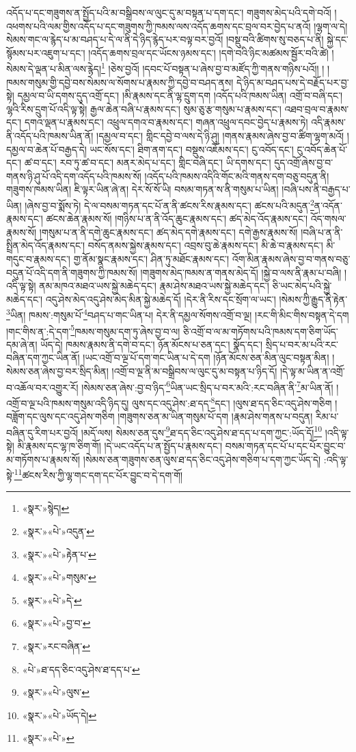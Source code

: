 འདོད་པ་དང་གཟུགས་ན་སྤྱོད་པའི་མ་བསྒྲིབས་ལ་ལུང་དུ་མ་བསྟན་པ་དག་དང་། གཟུགས་མེད་པའི་དགེ་བའོ། །འཕགས་པའི་ལམ་གྱིས་འདོད་པ་དང་གཟུགས་ཀྱི་ཁམས་ལས་འདོད་ཆགས་དང་བྲལ་བར་བྱེད་པ་ནའོ། །ལྷག་ལ་དེ། སེམས་གང་ལ་རྙེད་པ་མ་བཤད་པ་དེ་ལ་ནི་དེ་ཉིད་རྙེད་པར་བལྟ་བར་བྱའོ། །བསྡུ་བའི་ཚིགས་སུ་བཅད་པ་ནི། སྐྱེ་དང་སྙོམས་པར་འཇུག་པ་དང་། །འདོད་ཆགས་བྲལ་དང་ཡོངས་ཉམས་དང་། །དགེ་བའི་ཉིང་མཚམས་སྦྱོར་བའི་ཚེ། །སེམས་དེ་ལྡན་པ་མིན་ལས་རྙེད།\footnote{«སྣར་»སྙེད།} །ཅེས་བྱའོ། །དབང་པོ་བསྟན་པ་ཞེས་བྱ་བ་མཛོད་ཀྱི་གནས་གཉིས་པའོ།། །
།ཁམས་གསུམ་གྱི་དབྱེ་བས་སེམས་ལ་སོགས་པ་རྣམས་ཀྱི་དབྱེ་བ་བཤད་ནས། དེ་ཉིད་མ་བཤད་པས་དེ་བརྗོད་པར་བྱ་སྟེ། དམྱལ་བ་ཡི་དགས་དུད་འགྲོ་དང་། །མི་རྣམས་དང་ནི་ལྷ་དྲུག་དག །འདོད་པའི་ཁམས་ཡིན། འགྲོ་བ་བཞི་དང་། ལྷའི་རིས་དྲུག་པོ་འདི་ལྟ་སྟེ། རྒྱལ་ཆེན་བཞི་པ་རྣམས་དང་། སུམ་ཅུ་རྩ་གསུམ་པ་རྣམས་དང་། འཐབ་བྲལ་བ་རྣམས་དང་། དགའ་ལྡན་པ་རྣམས་དང་། འཕྲུལ་དགའ་བ་རྣམས་དང་། གཞན་འཕྲུལ་དབང་བྱེད་པ་རྣམས་ཏེ། འདི་རྣམས་ནི་འདོད་པའི་ཁམས་ཡིན་ནོ། །དམྱལ་བ་དང་། གླིང་དབྱེ་བ་ལས་དེ་ཉི་ཤུ། །གནས་རྣམས་ཞེས་བྱ་བ་ཚིག་ལྷག་མའོ། །དམྱལ་བ་ཆེན་པོ་བརྒྱད་དེ། ཡང་སོས་དང་། ཐིག་ནག་དང་། བསྡུས་འཇོམས་དང་། ངུ་འབོད་དང་། ངུ་འབོད་ཆེན་པོ་དང་། ཚ་བ་དང་། རབ་ཏུ་ཚ་བ་དང་། མནར་མེད་པ་དང་། གླིང་བཞི་དང་། ཡི་དགས་དང་། དུད་འགྲོ་ཞེས་བྱ་བ་གནས་ཉི་ཤུ་པོ་འདི་དག་འདོད་པའི་ཁམས་སོ། །འདོད་པའི་ཁམས་འདིའི་གོང་མའི་གནས་དག་བཅུ་བདུན་ནི། གཟུགས་ཁམས་ཡིན། ཇི་ལྟར་ཡིན་ཞེ་ན། དེར་སོ་སོ་ཡི། བསམ་གཏན་ས་ནི་གསུམ་པ་ཡིན། །བཞི་པས་ནི་བརྒྱད་པ་ཡིན། །ཞེས་བྱ་བ་སྨོས་ཏེ། དེ་ལ་བསམ་གཏན་དང་པོ་ན་ནི་ཚངས་རིས་རྣམས་དང་། ཚངས་པའི་མདུན་\footnote{«སྣར་»«པེ་»འདུན་}ན་འདོན་རྣམས་དང་། ཚངས་ཆེན་རྣམས་སོ། །གཉིས་པ་ན་ནི་འོད་ཆུང་རྣམས་དང་། ཚད་མེད་འོད་རྣམས་དང་། འོད་གསལ་རྣམས་སོ། །གསུམ་པ་ན་ནི་དགེ་ཆུང་རྣམས་དང་། ཚད་མེད་དགེ་རྣམས་དང་། དགེ་རྒྱས་རྣམས་སོ། །བཞི་པ་ན་ནི་སྤྲིན་མེད་འོད་རྣམས་དང་། བསོད་ནམས་སྐྱེས་རྣམས་དང་། འབྲས་བུ་ཆེ་རྣམས་དང་། མི་ཆེ་བ་རྣམས་དང་། མི་གདུང་བ་རྣམས་དང་། གྱ་ནོམ་སྣང་རྣམས་དང་། ཤིན་ཏུ་མཐོང་རྣམས་དང་། འོག་མིན་རྣམས་ཞེས་བྱ་བ་གནས་བཅུ་བདུན་པོ་འདི་དག་ནི་གཟུགས་ཀྱི་ཁམས་སོ། །གཟུགས་མེད་ཁམས་ན་གནས་མེད་དོ། །སྐྱེ་བ་ལས་ནི་རྣམ་པ་བཞི། །འདི་ལྟ་སྟེ། ནམ་མཁའ་མཐའ་ཡས་སྐྱེ་མཆེད་དང་། རྣམ་ཤེས་མཐའ་ཡས་སྐྱེ་མཆེད་དང་། ཅི་ཡང་མེད་པའི་སྐྱེ་མཆེད་དང་། འདུ་ཤེས་མེད་འདུ་ཤེས་མེད་མིན་སྐྱེ་མཆེད་དོ། །དེར་ནི་རིས་དང་སྲོག་ལ་ཡང་། །སེམས་ཀྱི་རྒྱུད་ནི་རྟེན་\footnote{«སྣར་»«པེ་»རྟེན་པ་}ཡིན། ཁམས་:གསུམ་པོ་\footnote{«སྣར་»«པེ་»གསུམ་}བཤད་པ་གང་ཡིན་པ། དེར་ནི་དམྱལ་སོགས་འགྲོ་བ་ལྔ། །རང་གི་མིང་གིས་བསྟན་དེ་དག །གང་གིས་ན་:དེ་དག་\footnote{«སྣར་»«པེ་»དེ་}ཁམས་གསུམ་དག་ཏུ་ཞེས་བྱ་བ་ལ། ཅི་འགྲོ་བ་ལ་མ་གཏོགས་པའི་ཁམས་དག་ཅིག་ཡོད་དམ་ཞེ་ན། ཡོད་དེ། ཁམས་རྣམས་ནི་དགེ་བ་དང་། ཉོན་མོངས་པ་ཅན་དང་། སྣོད་དང་། སྲིད་པ་བར་མ་པའི་རང་བཞིན་དག་ཀྱང་ཡིན་ནོ། །ཡང་འགྲོ་བ་ལྔ་པོ་དག་གང་ཡིན་པ་དེ་དག །ཉོན་མོངས་ཅན་མིན་ལུང་བསྟན་མིན། །སེམས་ཅན་ཞེས་བྱ་བར་སྲིད་མིན། །འགྲོ་བ་ལྔ་ནི་མ་བསྒྲིབས་ལ་ལུང་དུ་མ་བསྟན་པ་ཉིད་དོ། །དེ་ལྟ་མ་ཡིན་ན་འགྲོ་བ་འཆོལ་བར་འགྱུར་རོ། །སེམས་ཅན་ཞེས་:བྱ་བ་ཉིད་\footnote{«སྣར་»«པེ་»བྱ་བ་}ཡིན་ཡང་སྲིད་པ་བར་མའི་:རང་བཞིན་ནི་\footnote{«སྣར་»རང་བཞིན་}མ་ཡིན་ནོ། །འགྲོ་བ་ལྔ་པའི་ཁམས་གསུམ་འདི་ཉིད་དུ། ལུས་དང་འདུ་ཤེས་:ཐ་དད་\footnote{«པེ་»ཐ་དད་ཅིང་འདུ་ཤེས་ཐ་དད་པ་}དང་། །ལུས་ཐ་དད་ཅིང་འདུ་ཤེས་གཅིག །བཟློག་དང་ལུས་དང་འདུ་ཤེས་གཅིག །གཟུགས་ཅན་མ་ཡིན་གསུམ་པོ་དག །རྣམ་ཤེས་གནས་པ་བདུན། རིམ་པ་བཞིན་དུ་རིག་པར་བྱའོ། །མདོ་ལས། སེམས་ཅན་དུས་\footnote{«སྣར་»«པེ་»ལུས་}ཐ་དད་ཅིང་འདུ་ཤེས་ཐ་དད་པ་དག་ཀྱང་:ཡོད་དོ།\footnote{«སྣར་»«པེ་»ཡོད་དེ།} །འདི་ལྟ་སྟེ། མི་རྣམས་དང་ལྷ་ཁ་ཅིག་གོ། །དེ་ཡང་འདོད་པ་ན་སྤྱོད་པ་རྣམས་དང་། བསམ་གཏན་དང་པོ་པ་དང་པོར་བྱུང་བ་མ་གཏོགས་པ་རྣམས་སོ། །སེམས་ཅན་གཟུགས་ཅན་ལུས་ཐ་དད་ཅིང་འདུ་ཤེས་གཅིག་པ་དག་ཀྱང་ཡོད་དེ། :འདི་ལྟ་སྟེ་\footnote{«སྣར་»«པེ་»}ཚངས་རིས་ཀྱི་ལྷ་གང་དག་དང་པོར་བྱུང་བ་དེ་དག་གོ། 